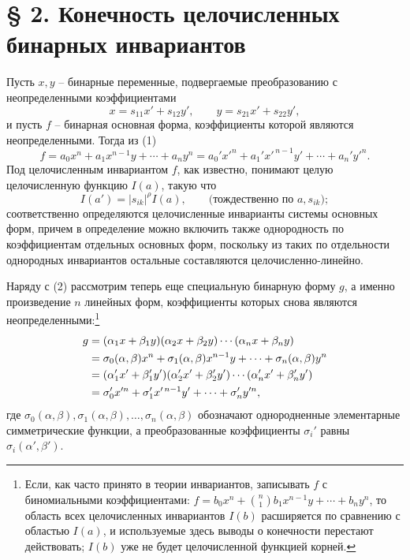 \documentclass[11pt]{article}
\begin{document}
\setcounter{equation}{0}
\section*{§ 2. Конечность целочисленных бинарных инвариантов}

Пусть \(x,y\) -- бинарные переменные, подвергаемые преобразованию с неопределенными коэффициентами
\begin{equation}
        x=s_{11}x'+s_{12}y',\qquad y=s_{21}x'+s_{22}y',
\end{equation}
и пусть \(f\) -- бинарная основная форма, коэффициенты которой являются неопределенными. Тогда из (1)
\begin{equation}
        f=a_0x^n+a_1x^{n-1}y+\cdots+a_ny^n
        =a_0'x'^n+a_1'x'^{\,n-1}y'+\cdots+a_n'y'^n.
\end{equation}
Под целочисленным инвариантом \(f\), как известно, понимают целую целочисленную функцию \(I(a)\), такую что
\begin{equation}
        I(a')=|s_{ik}|^\rho I(a),\qquad \text{(тождественно по \(a,s_{ik}\))};
\end{equation}
соответственно определяются целочисленные инварианты системы основных форм, причем в определение можно включить также однородность по коэффициентам отдельных основных форм, поскольку из таких по отдельности однородных инвариантов остальные составляются целочисленно-линейно.

Наряду с (2) рассмотрим теперь еще специальную бинарную форму \(g\), а именно произведение \(n\) линейных форм, коэффициенты которых снова являются неопределенными:\footnote{Если, как часто принято в теории инвариантов, записывать \(f\) с биномиальными коэффициентами: \(f=b_0x^n+\binom n1b_1x^{n-1}y+\cdots+b_ny^n\), то область всех целочисленных инвариантов \(I(b)\) расширяется по сравнению с областью \(I(a)\), и используемые здесь выводы о конечности перестают действовать; \(I(b)\) уже не будет целочисленной функцией корней.}
\begin{align}
        g&=(\alpha_1x+\beta_1y)(\alpha_2x+\beta_2y)\cdots(\alpha_nx+\beta_ny)\notag\\
         &=\sigma_0(\alpha,\beta)x^n+\sigma_1(\alpha,\beta)x^{n-1}y+\cdots+\sigma_n(\alpha,\beta)y^n\notag\\
         &=(\alpha_1'x'+\beta_1'y')(\alpha_2'x'+\beta_2'y')\cdots(\alpha_n'x'+\beta_n'y')\notag\\
         &=\sigma_0'x'^n+\sigma_1'x'^{\,n-1}y'+\cdots+\sigma_n'y'^n,
\end{align}
где \(\sigma_0(\alpha,\beta),\sigma_1(\alpha,\beta),\ldots,\sigma_n(\alpha,\beta)\) обозначают однородненные элементарные симметрические функции, а преобразованные коэффициенты \(\sigma_i'\) равны \(\sigma_i(\alpha',\beta')\).
\end{document}
